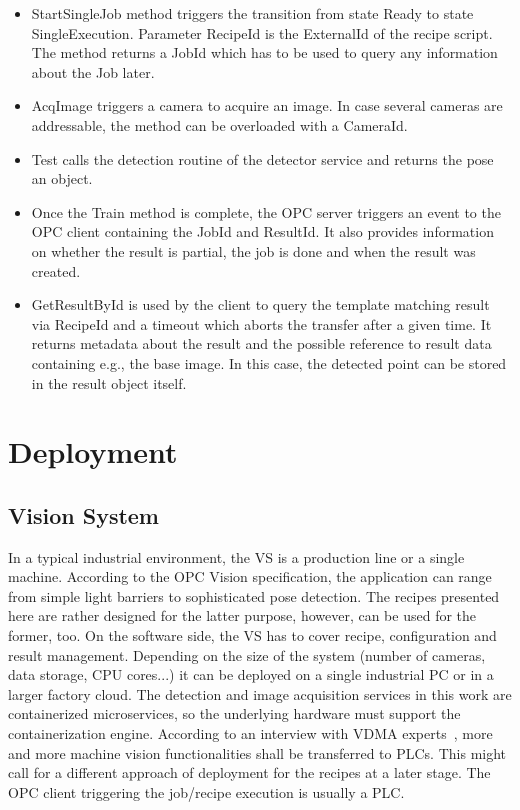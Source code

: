 \begin{itemize}
\begin{itemize}
    	\item StartSingleJob method triggers the transition from state Ready to state SingleExecution. Parameter RecipeId is the ExternalId of the recipe script. The method returns a JobId which has to be used to query any information about the Job later.
    	\item AcqImage triggers a camera to acquire an image. In case several cameras are addressable, the method can be overloaded with a CameraId.
    	\item Test calls the detection routine of the detector service and returns the pose an object.
    	\item Once the Train method is complete, the OPC server triggers an event to the OPC client containing the JobId and ResultId. It also provides information on whether the result is partial, the job is done and when the result was created.
    	\item GetResultById is used by the client to query the template matching result via RecipeId and a timeout which aborts the transfer after a given time. It returns metadata about the result and the possible reference to result data containing e.g., the base image. In this case, the detected point can be stored in the result object itself.
    \end{itemize}
\end{itemize}

\section{Deployment}
\subsection{Vision System}
In a typical industrial environment, the VS is a production line or a single machine. According to the OPC Vision specification, the application can range from simple light barriers to sophisticated pose detection. The recipes presented here are rather designed for the latter purpose, however, can be used for the former, too. On the software side, the VS has to cover recipe, configuration and result management. Depending on the size of the system (number of cameras, data storage, CPU cores...) it can be deployed on a single industrial PC or in a larger factory cloud. The detection and image acquisition services in this work are containerized microservices, so the underlying hardware must support the containerization engine. According to an interview with VDMA experts~\cite{VDMA2015OPC2019}, more and more machine vision functionalities shall be transferred to PLCs. This might call for a different approach of deployment for the recipes at a later stage. The OPC client triggering the job/recipe execution is usually a PLC.

